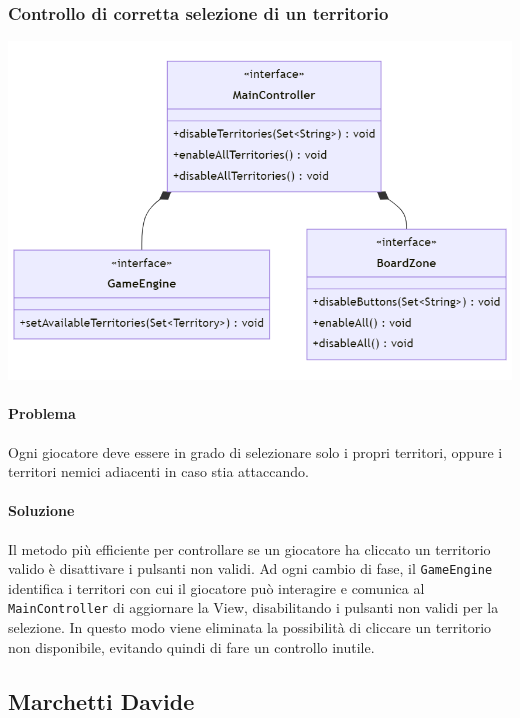 \documentclass[a4paper,12pt]{report}
\begin{document}
\subsubsection*{Controllo di corretta selezione di un territorio}
%
\includegraphics[width=\textwidth]{img/DisableButtons.png}
%
\paragraph*{Problema} Ogni giocatore deve essere in grado di selezionare solo i propri territori, oppure i territori nemici adiacenti in caso stia attaccando.
%
\paragraph*{Soluzione} Il metodo pi\`u efficiente per controllare se un giocatore ha cliccato un territorio valido \`e disattivare i pulsanti non validi. Ad ogni cambio di fase, il \texttt{GameEngine} identifica i territori con cui il giocatore pu\`o interagire e comunica al \texttt{MainController} di aggiornare la View, disabilitando i pulsanti non validi per la selezione. In questo modo viene eliminata la possibilit\`a di cliccare un territorio non disponibile, evitando quindi di fare un controllo inutile.
%
\subsection{Marchetti Davide}
%
\end{document}
